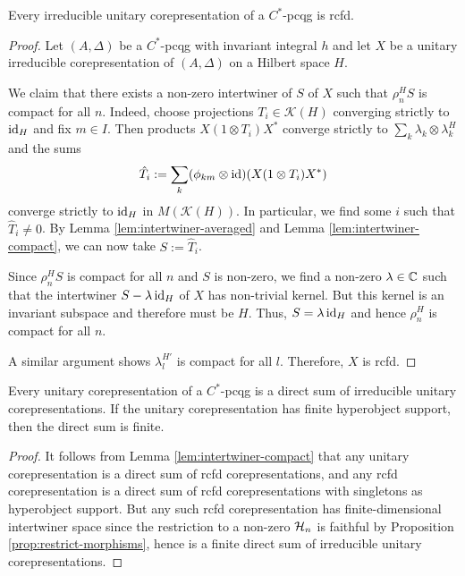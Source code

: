 \begin{Prop} \label{prop:corep-rcfd}
Every irreducible unitary corepresentation of a  $C^{*}$-pcqg is rcfd.
\end{Prop}
\begin{proof}
  Let $(A,\Delta)$ be a $C^{*}$-pcqg with invariant integral $h$ and
  let $X$ be a unitary irreducible corepresentation of $(A,\Delta)$ on
  a Hilbert space $H$.

  We claim that there exists a non-zero intertwiner of $S$ of $X$ such
  that $\rho^{H}_{n}S$ is compact for all $n$.  Indeed, choose
  projections $T_{i} \in \mathcal{K}(H)$ converging strictly to
  $\operatorname{id}_{H}$ and fix $m\in I$. Then products $X(1\otimes T_{i})X^{*}$
  converge strictly to $\sum_{k} \lambda_{k} \otimes \lambda_{k}^{H}$
  and the sums
  \begin{align*}
    \hat T_{i} := \sum_{k}(\phi_{km} \otimes \operatorname{id})(X(1\otimes T_{i})X^{*})
  \end{align*}
  converge strictly to $\operatorname{id}_{H}$ in $M(\mathcal{K}(H))$. In  particular, we find some $i$ such that $\hat T_{i}\neq 0$.  By Lemma  \ref{lem:intertwiner-averaged} and  Lemma   \ref{lem:intertwiner-compact}, we can now take $S:=\hat T_{i}$.

  Since $\rho^{H}_{n}S$ is compact for all $n$ and $S$ is non-zero, we  find a non-zero $\lambda\in \mathbb{C}$ such that the  intertwiner $S-\lambda\operatorname{id}_{H}$ of $X$ has non-trivial kernel.  But  this kernel is an invariant subspace and therefore must be $H$.  Thus, $S=\lambda\operatorname{id}_{H}$ and hence $\rho^{H}_{n}$ is compact for all  $n$.

  A similar argument shows $\lambda^{H'}_{l}$ is compact for all  $l$. Therefore, $X$ is rcfd.
\end{proof}



\begin{Cor} \label{cor:corep-decompose} Every unitary corepresentation
  of a $C^{*}$-pcqg  is a direct sum of irreducible unitary
  corepresentations. If the unitary corepresentation has finite hyperobject support, then the
  direct sum is finite.
\end{Cor}
\begin{proof} It follows from Lemma \ref{lem:intertwiner-compact} that any unitary corepresentation is a direct sum of rcfd corepresentations, and any rcfd corepresentation is a direct sum of rcfd corepresentations with singletons as hyperobject support. But any such rcfd corepresentation has finite-dimensional intertwiner space since the restriction to a non-zero $\mathcal{H}_n$ is faithful by Proposition \ref{prop:restrict-morphisms}, hence is a finite direct sum of irreducible unitary corepresentations. 
\end{proof} 

